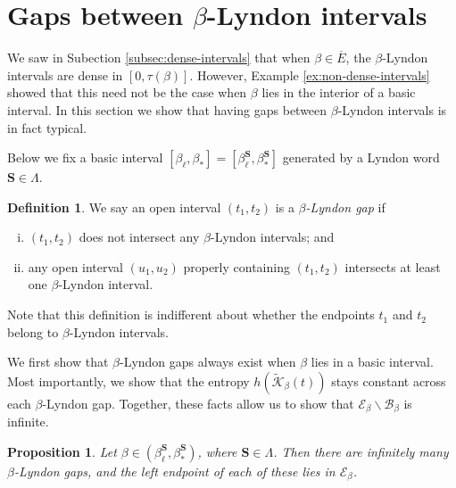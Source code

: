 \documentclass[11pt]{amsart}
\newtheorem{proposition}[theorem]{Proposition}
\theoremstyle{definition}
\newtheorem{definition}[theorem]{Definition}
\theoremstyle{remark}
\numberwithin{equation}{section}
\newcommand{\BB}{\mathscr{B}}
\newcommand{\EE}{\mathscr{E}}
\newcommand{\Kt}{\widetilde{\mathcal{K}}}
\newcommand{\cs}{ {\mathbf{S}}}
\newcommand{\La}{\Lambda}
\begin{document}
\section{Gaps between $\beta$-Lyndon intervals} \label{sec:gaps}

We saw in Subection \ref{subsec:dense-intervals} that when $\beta\in \overline{E}$, the $\beta$-Lyndon intervals are dense in $[0,\tau(\beta)]$. However, Example \ref{ex:non-dense-intervals} showed that this need not be the case when $\beta$ lies in the interior of a basic interval. In this section we show that having gaps between $\beta$-Lyndon intervals is in fact typical.

Below we fix a basic interval $[\beta_\ell,\beta_*]=[\beta_\ell^{\cs},\beta_*^{\cs}]$ generated by a Lyndon word $\cs\in\La$.

\begin{definition} \label{def:beta-Lyndon-gap}
We say an open interval $(t_1,t_2)$ is a {\em $\beta$-Lyndon gap} if
\begin{enumerate}[(i)]
\item $(t_1,t_2)$ does not intersect any $\beta$-Lyndon intervals; and
\item any open interval $(u_1,u_2)$ properly containing $(t_1,t_2)$ intersects at least one $\beta$-Lyndon interval.
\end{enumerate}
\end{definition}

Note that this definition is indifferent about whether the endpoints $t_1$ and $t_2$ belong to $\beta$-Lyndon intervals.

We first show that $\beta$-Lyndon gaps always exist when $\beta$ lies in a basic interval.
Most importantly, we show that the entropy $h(\Kt_\beta(t))$ stays constant across each $\beta$-Lyndon gap. {Together, these facts allow us to show that $\EE_\beta\backslash\BB_\beta$ is infinite.} 

\begin{proposition} \label{cor:gaps-exist}
Let $\beta\in(\beta_\ell^{\cs},\beta_*^{\cs})$, where $\cs\in\La$. Then there are infinitely many $\beta$-Lyndon gaps, and the left endpoint of each of these lies in $\EE_\beta$.
\end{proposition}
\end{document}
